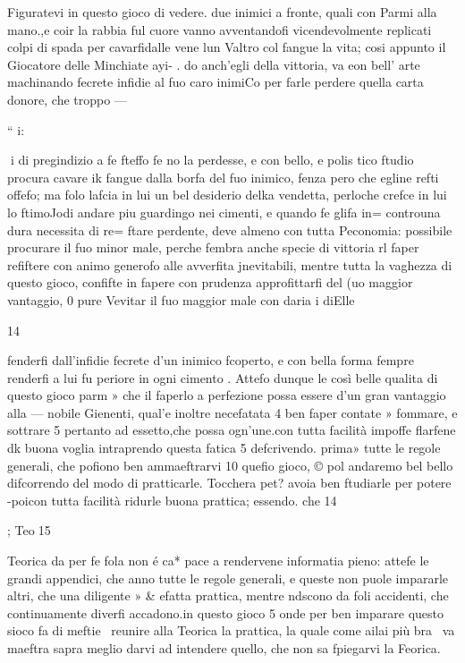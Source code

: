 \documentclass[12pt,a6paper]{article}
\begin{document}
Figuratevi in questo gioco di
vedere. due inimici a fronte,
quali con Parmi alla mano.,e
coir la rabbia ful cuore vanno
avventandofi vicendevolmente
replicati colpi di spada per cavarfidalle vene lun Valtro col
fangue la vita; cosi appunto il
Giocatore delle Minchiate ayi- .
do anch’egli della vittoria, va
eon bell’ arte machinando fecrete infidie al fuo caro inimiCo per farle perdere quella carta donore, che troppo —

“ i:

 
i
di pregindizio a fe fteffo fe no
la perdesse, e con bello, e polis
tico ftudio procura cavare ik
fangue dalla borfa del fuo inimico, fenza pero che egline
refti offefo; ma folo lafcia in lui
un bel desiderio delka vendetta,
perloche crefce in lui lo ftimoJodi andare piu guardingo nei
cimenti, e quando fe glifa in=
controuna dura necessita di re=
ftare perdente, deve almeno
con tutta Peconomia: possibile
procurare il fuo minor male,
perche fembra anche specie di
vittoria rl faper refiftere con
animo generofo alle avverfita
jnevitabili, mentre tutta la vaghezza di questo gioco, confifte
in fapere con prudenza approfittarfi del (uo maggior vantaggio, 0 pure Vevitar il fuo maggior male con daria i diElle
 

 

14

fenderfi dall’infidie fecrete d'un
inimico fcoperto, e con bella
forma fempre renderfi a lui fu
periore in ogni cimento .
Attefo dunque le così belle
qualita di questo gioco parm »
che il faperlo a perfezione possa
essere d’un gran vantaggio alla —
nobile Gienenti, qual’e inoltre
necefatata 4 ben faper contate »
fommare, e sottrare 5 pertanto
ad essetto,che possa ogn’une.con
tutta facilità impoffe flarfene dk
buona voglia intraprendo questa fatica 5 defcrivendo. prima»
tutte le regole generali, che
pofiono ben ammaeftrarvi 10
quefio gioco, © pol andaremo
bel bello difcorrendo del modo
di pratticarle. Tocchera pet?
avoia ben ftudiarle per potere
-poicon tutta facilità ridurle
buona prattica; essendo. che 14

; Teo15

Teorica da per fe fola non é ca*
pace a rendervene informatia
pieno: attefe le grandi appendici, che anno tutte le regole generali, e queste non puole impararle altri, che una diligente »
& efatta prattica, mentre ndscono da foli accidenti, che continuamente diverfi accadono.in
questo gioco 5 onde per ben imparare questo sioco fa di meftie~
reunire alla Teorica la prattica, la quale come ailai più bra~
va maeftra sapra meglio darvi
ad intendere quello, che non sa
fpiegarvi la Feorica.
\end{document}
